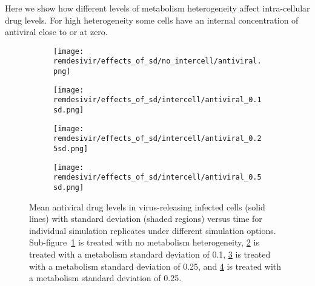 Here we show how different levels of metabolism heterogeneity affect intra-cellular drug levels. For high heterogeneity some cells have an internal concentration of antiviral close to or at zero.

\begin{figure}[H]
  
  \begin{subfigure}[b]{0.48\linewidth}
    \centering
    \texttt{[image: remdesivir/effects\_of\_sd/no\_intercell/antiviral.png]} 
    \caption{} 
    \label{fig:res:change-sd:compare:av:no} 
  \end{subfigure} 
  \hspace{\fill}  %
  \begin{subfigure}[b]{0.48\linewidth}
    \centering
    \texttt{[image: remdesivir/effects\_of\_sd/intercell/antiviral\_0.1sd.png]} 
    \caption{} 
    \label{fig:res:change-sd:compare:av:0.1} 
  \end{subfigure} 


    \vspace{4ex}
  \begin{subfigure}[b]{0.48\linewidth}
    \centering
    \texttt{[image: remdesivir/effects\_of\_sd/intercell/antiviral\_0.25sd.png]} 
    \caption{} 
    \label{fig:res:change-sd:compare:av:0.25} 
  \end{subfigure} 
  \hspace{\fill}
  \begin{subfigure}[b]{0.48\linewidth}
    \centering
    \texttt{[image: remdesivir/effects\_of\_sd/intercell/antiviral\_0.5sd.png]} 
    \caption{} 
    \label{fig:res:change-sd:compare:av:0.5} 
  \end{subfigure} 
\caption{Mean antiviral drug levels in virus-releasing infected cells (solid lines) with standard deviation (shaded regions) versus time for individual simulation replicates under different simulation options. Sub-figure~\ref{fig:res:change-sd:compare:av:no} is treated with no metabolism heterogeneity, \ref{fig:res:change-sd:compare:av:0.1} is treated with a metabolism standard deviation of 0.1, \ref{fig:res:change-sd:compare:av:0.25} is treated with a metabolism standard deviation of 0.25, and \ref{fig:res:change-sd:compare:av:0.5} is treated with a metabolism standard deviation of 0.25.}\label{fig:res:change-sd:compare-av} 
\end{figure}
